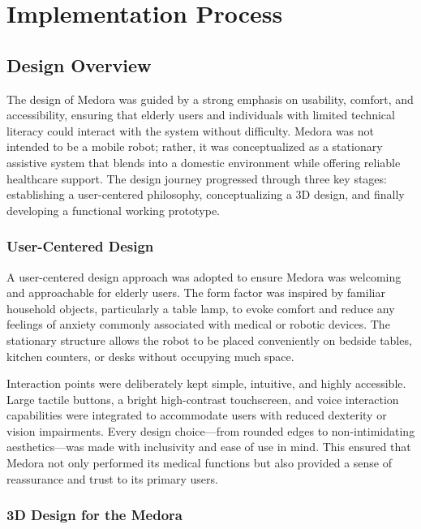 \chapter{Implementation  Process}

\section{Design Overview}

The design of Medora was guided by a strong emphasis on usability, comfort, and accessibility, ensuring that elderly users and individuals with limited technical literacy could interact with the system without difficulty. Medora was not intended to be a mobile robot; rather, it was conceptualized as a stationary assistive system that blends into a domestic environment while offering reliable healthcare support. The design journey progressed through three key stages: establishing a user-centered philosophy, conceptualizing a 3D design, and finally developing a functional working prototype.

\subsection{User-Centered Design}

A user-centered design approach was adopted to ensure Medora was welcoming and approachable for elderly users. The form factor was inspired by familiar household objects, particularly a table lamp, to evoke comfort and reduce any feelings of anxiety commonly associated with medical or robotic devices. The stationary structure allows the robot to be placed conveniently on bedside tables, kitchen counters, or desks without occupying much space.  

Interaction points were deliberately kept simple, intuitive, and highly accessible. Large tactile buttons, a bright high-contrast touchscreen, and voice interaction capabilities were integrated to accommodate users with reduced dexterity or vision impairments. Every design choice—from rounded edges to non-intimidating aesthetics—was made with inclusivity and ease of use in mind. This ensured that Medora not only performed its medical functions but also provided a sense of reassurance and trust to its primary users.

\subsection{3D Design for the Medora}

